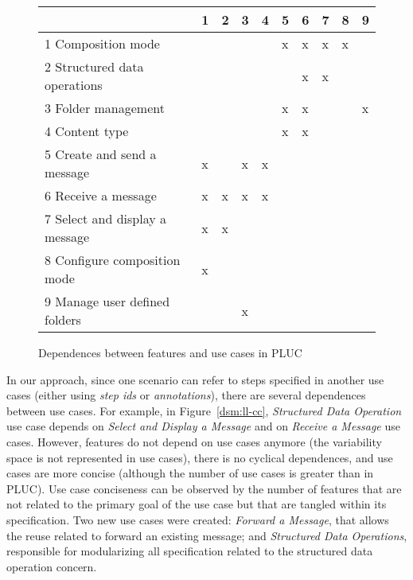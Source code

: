 \documentclass{acm_proc_article-sp}
\begin{document}
\begin{figure}[t]
\centering
\begin{scriptsize}
\begin{tabular}{llllllllll} \hline
								& 1 	& 2 	& 3 & 4 	& 5 	& 6 	& 7 	& 8 	& 9 	\\ \hline
1 Composition mode 				& 	& 	& 	& 	& x	& x	& x	& x	& 	\\
2 Structured data operations	 		& 	& 	& 	& 	& 	& x	& x	& 	& 	\\
3 Folder management 				& 	& 	& 	& 	& x	& x	& 	& 	& x	\\
4 Content type						& 	& 	& 	& 	& x	& x	& 	& 	& 	\\ \hline
5 Create and send a message 			& x	& 	& x	& x	& 	& 	& 	& 	& 	\\
6 Receive a message 				& x	& x	& x	& x	& 	&	& 	& 	& 	\\
7 Select and display a message 		& x	& x	& 	& 	& 	& 	& 	& 	& 	\\
8 Configure composition mode 		& x	& 	& 	& 	& 	& 	& 	& 	& 	\\
9 Manage user defined folders 		& 	& 	& x	& 	& 	& 	& 	& 	& 	\\ \hline
\end{tabular}
\end{scriptsize}
\caption{Dependences between features and use cases in PLUC}
\label{dsm:ll-pluc}
\end{figure}   

In our approach, since one scenario can refer to steps specified in
another use cases (either using \emph{step ids} or \emph{annotations}), there are several 
dependences between use
cases. For example, in Figure~\ref{dsm:ll-cc}, \emph{Structured Data Operation} 
use case depends on \emph{Select and Display a Message} and on \emph{Receive a Message} use cases. 
However, features do not depend on use cases anymore (the variability space is not represented in use
cases), there is no cyclical dependences, and use cases are more concise (although the number
of use cases is greater than in PLUC). Use case conciseness can be observed by the number of
features that are not related to the primary goal of the use case but that are tangled within its
specification. Two new use cases were created: \emph{Forward a Message}, that allows the reuse related 
to forward an existing message; and \emph{Structured Data
Operations}, responsible for modularizing all specification related to the structured data operation
concern.
\end{document}
